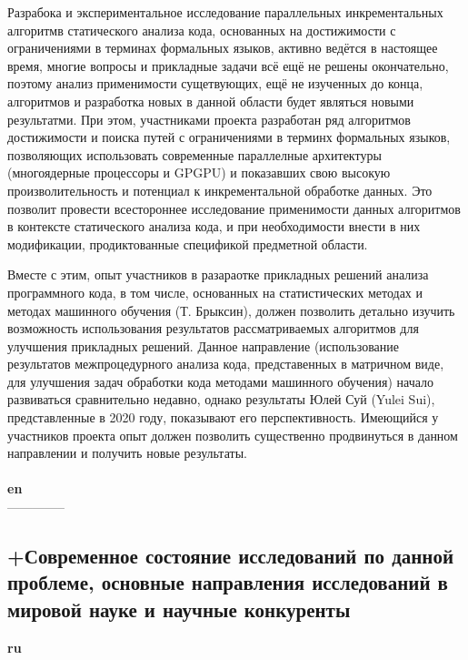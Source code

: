 \documentclass[12pt]{article}  %
\theoremstyle{remark}
\begin{document}
Разрабока и экспериментальное исследование параллельных инкрементальных алгоритмв статического анализа кода, основанных на достижимости с ограничениями в терминах формальных языков, активно ведётся в настоящее время, многие вопросы и прикладные задачи всё ещё не решены окончательно, поэтому анализ применимости сущетвующих, ещё не изученных до конца, алгоритмов и разработка новых в данной области будет являться новыми результатми. При этом, участниками проекта разработан ряд алгоритмов достижимости и поиска путей с ограничениями в терминх формальных языков, позволяющих использовать современные параллелные архитектуры (многоядерные процессоры и GPGPU) и показавших свою высокую произволительность и потенциал к инкрементальной обработке данных. Это позволит провести всестороннее исследование применимости данных алгоритмов в контексте статического анализа кода, и при необходимости внести в них модификации, продиктованные спецификой предметной области. 

Вместе с этим, опыт участников в разараотке прикладных решений анализа программного кода, в том числе, основанных на статистических методах и методах машинного обучения (Т. Брыксин), должен позволить детально изучить возможность использования результатов рассматриваемых алгоритмов для улучшения прикладных решений. Данное направление (использование результатов межпроцедурного анализа кода, представенных в матричном виде, для улучшения задач обработки кода методами машинного обучения) начало развиваться сравнительно недавно, однако результаты Юлей Суй (Yulei Sui), представленные в 2020 году, показывают его перспективность. Имеющийся у участников проекта опыт должен позволить существенно продвинуться в данном направлении и получить новые результаты.
\\
\\
\textbf{en}\\

--------------


\subsection{+Современное состояние исследований по данной проблеме, основные направления исследований в мировой науке и научные конкуренты}

\textbf{ru}\\
\end{document}
